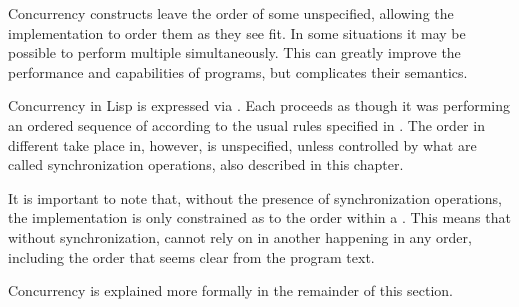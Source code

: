 

Concurrency constructs leave the order of some 
unspecified, allowing the implementation to order them as they see
fit. In some situations it may be possible to perform multiple
 simultaneously. This can greatly improve the
performance and capabilities of programs, but complicates their
semantics.

Concurrency in Lisp is expressed via . Each
 proceeds as though it was performing an ordered sequence
of  according to the usual rules specified in
\secref\EvaluationModel. The order  in different
 take place in, however, is unspecified, unless
controlled by what are called synchronization operations, also
described in this chapter.

It is important to note that, without the presence of synchronization
operations, the implementation is only constrained as to the
 order within a . This means that
without synchronization,  cannot rely on
 in another  happening in any order,
including the order that seems clear from the program text.

Concurrency is explained more formally in the remainder of this
section.


\endSection%


\endSection%


\endSection%


\endchapter

\bye

